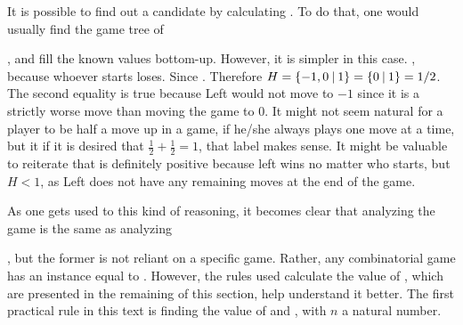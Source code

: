 It is possible to find out a candidate by calculating \Gm{ + \Hm + \Hm}. To do that, one would usually find the game tree of 
\Gm{ + \Hm + \Hm}
, and fill the known values bottom-up. However, it is simpler in this case. , because whoever starts loses. Since . Therefore $H = \mbox{$\{{-}1, 0\:|\:1\}$} = \mbox{$\{0\:|\:1\}$} = 1/2$. The second equality is true because Left would not move to $-1$ since it is a strictly worse move than moving the game to $0$. It might not seem natural for a player to be half a move up in a game, if he/she always plays one move at a time, but it if it is desired that $\frac{1}{2} + \frac{1}{2} = 1$, that label makes sense. It might be valuable to reiterate that \Hm is definitely positive because left wins no matter who starts, but $H < 1$, as Left does not have any remaining moves at the end of the game.

As one gets used to this kind of reasoning, it becomes clear that analyzing the game  is the same as analyzing 
, but the former is not reliant on a specific game. Rather, any combinatorial game has an instance equal to . However, the rules used calculate the value of , which are presented in the remaining of this section, help understand it better. The first practical rule in this text is finding the value of  and , with $n$ a natural number.

